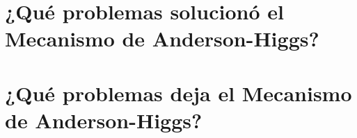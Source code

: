 \section{¿Qué problemas solucionó el Mecanismo de Anderson-Higgs?}

\section{¿Qué problemas deja el Mecanismo de Anderson-Higgs?}
